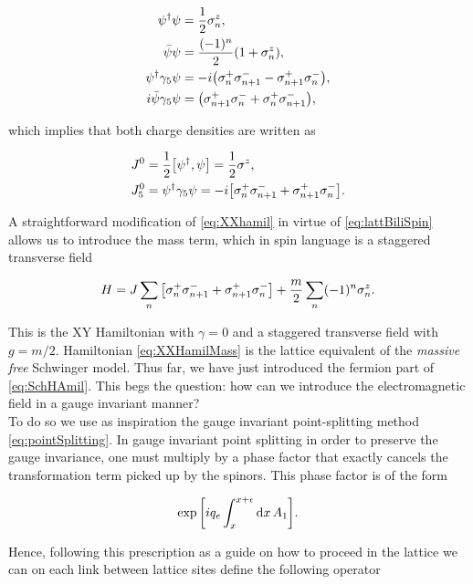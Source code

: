 \begin{align}
    \psi^\dagger\psi &= \frac{1}{2}\sigma^z_n,\nonumber\\
    \bar\psi\psi &= \frac{(-1)^n}{2}\qty(1+\sigma^z_n),\nonumber\\
    \psi^\dagger\gamma_5\psi &= -i\qty(\sigma^+_n \sigma^-_{n+1} - \sigma^+_{n+1}\sigma^-_n),\nonumber\\
    i\bar{\psi}\gamma_5\psi &= \qty(\sigma^+_{n+1} \sigma^-_{n} + \sigma^+_{n}\sigma^-_{n+1}),\label{eq:lattBiliSpin}
\end{align}

which implies that both charge densities are written as

\begin{align}
    J^0 &= \frac{1}{2}\comm{\psi^\dagger}{\psi} = \frac{1}{2}\sigma^z,\nonumber\\
    J_5^0 &= \psi^\dagger\gf\psi = -i\qty[\sigma^+_n\sigma^-_{n+1} + \sigma^+_{n+1}\sigma^-_{n}].
\end{align}

A straightforward modification of \eqref{eq:XXhamil} in virtue of \eqref{eq:lattBiliSpin} allows us to introduce the mass term, which in spin language is a staggered transverse field

\begin{equation}
H = J\sum_n\qty[\sigma^+_n\sigma^-_{n+1} + \sigma^+_{n+1}\sigma^-_n] + \frac{m}{2}\sum_n (-1)^n\sigma^z_n\label{eq:XXHamilMass}.
\end{equation}

This is the XY Hamiltonian with $\gamma=0$ and a staggered transverse field with $g=m/2$. Hamiltonian \eqref{eq:XXHamilMass} is the lattice equivalent of the \emph{massive free} Schwinger model. Thus far, we have just introduced the fermion part of \eqref{eq:SchHAmil}. This begs the question: how can we introduce the electromagnetic field in a gauge invariant manner?\\

To do so we use as inspiration the gauge invariant point-splitting method \eqref{eq:pointSplitting}. In gauge invariant point splitting in order to preserve the gauge invariance, one must multiply by a phase factor that exactly cancels the transformation term picked up by the spinors. This phase factor is of the form

\begin{equation*}
    \exp\qty[i q_e\int_x^{x+\epsilon}\dd{x}A_1].
\end{equation*}

Hence, following this prescription as a guide on how to proceed in the lattice we can on each link between lattice sites define the following operator

